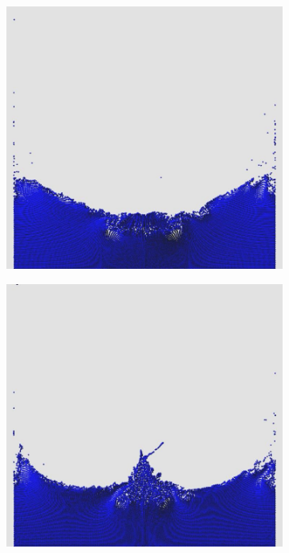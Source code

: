 \documentclass[12pt,a4paper,dvipsnames]{article}
\begin{document}
\begin{figure}[!h]
\begin{subfigure}[!h]{0.3\textwidth}
	\end{subfigure}
	\begin{subfigure}[!h]{0.3\textwidth} \centering
		\includegraphics[width=\textwidth]{WD/WD-07.jpg}
	\end{subfigure}
	\begin{subfigure}[!h]{0.3\textwidth} \centering
		\includegraphics[width=\textwidth]{WD/WD-08.jpg}

\end{subfigure}
\end{figure}
\end{document}
